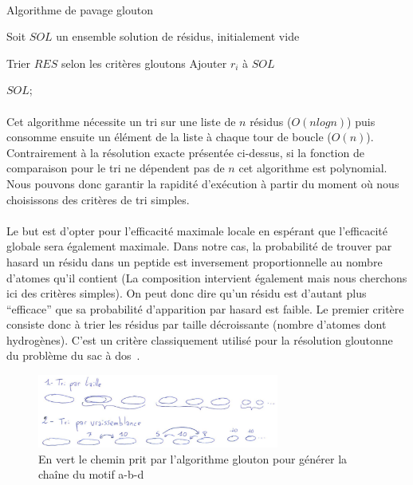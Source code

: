\documentclass[12pt,french,twoside]{report}
\begin{document}
\paragraph{}
\begin{algorithm}[H]
  \caption{Algorithme de pavage glouton}
  Soit $SOL$ un ensemble solution de résidus, initialement vide\;
  
  Trier $RES$ selon les critères gloutons\;
   {
     {
      Ajouter $r_i$ à $SOL$\;
    }
  }
  
  \KwRet $SOL$;
\end{algorithm}

\paragraph{}Cet algorithme nécessite un tri sur une liste de $n$ résidus ($O(n log n)$) puis consomme ensuite un élément de la
liste à chaque tour de boucle ($O(n)$). Contrairement à la résolution exacte présentée ci-dessus, si la fonction de comparaison
pour le tri ne dépendent pas de $n$ cet algorithme est polynomial.
Nous pouvons donc garantir la rapidité d'exécution à partir du moment où nous choisissons des critères de tri simples.

\paragraph{}Le but est d'opter pour l'efficacité maximale locale en espérant que l'efficacité globale sera également maximale.
Dans notre cas, la probabilité de trouver par hasard un résidu dans un peptide est
inversement proportionnelle au nombre d'atomes qu'il contient (La composition intervient également mais nous cherchons ici des
critères simples). On peut donc dire qu'un résidu est d'autant plus ``efficace'' que sa probabilité d'apparition par hasard est
faible. Le premier critère consiste donc à trier les résidus par taille décroissante (nombre d'atomes dont hydrogènes).
C'est un critère classiquement utilisé pour la résolution gloutonne du problème du sac à dos~\cite{_probleme_2016}.

\begin{figure}
  \includegraphics[width=300px]{Figures/s2m/pavage/tri_glouton.pdf}
  \caption{\label{tri_glouton}En vert le chemin prit par l'algorithme glouton pour générer la chaîne du motif a-b-d}
\end{figure}
\end{document}
